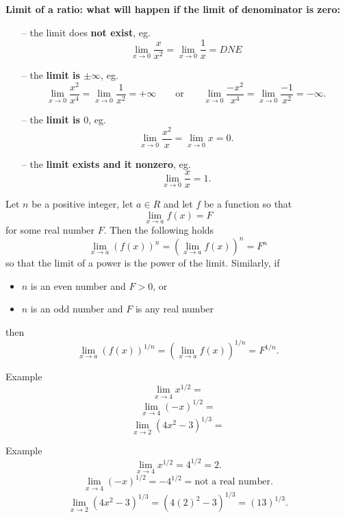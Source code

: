 \documentclass{beamer}
\begin{document}
\begin{frame}{{\bf Limit of a ratio: what will happen if the limit of denominator is zero:}}
\begin{itemize}
	\item[--] the limit does {\bf not exist}, eg. 
	$$  \lim_{x\to 0} \frac{x}{x^2}=\lim_{x\to 0} \frac{1}{x}=DNE$$ \pause
	\item[--] the {\bf limit is $\pm \infty$}, eg. 
	$$\lim_{x\to 0} \frac{x^2}{x^4}=\lim_{x\to 0} \frac{1}{x^2}=+\infty \quad \quad \text{or} \quad \quad \lim_{x\to 0} \frac{-x^2}{x^4}=\lim_{x\to 0} \frac{-1}{x^2}=-\infty.$$\pause 
	\item[--] the {\bf limit is $0$}, eg. $$\lim_{x\to 0} \frac{x^2}{x}=\lim_{x\to 0} x=0.$$ \pause 
	\item[--] the {\bf limit exists and it nonzero}, eg. $$\lim_{x\to 0} \frac{x}{x}=1.$$
\end{itemize}
\end{frame}

\begin{frame}

\begin{tcolorbox}[width=\textwidth,colback={blue!10},title={},colbacktitle=yellow,coltitle=blue]  
	\begin{theorem}
		Let $n$ be a positive integer, let $a\in R$ and let $f$ be a function so that
		$$\lim_{x\to a}f(x)=F$$ for some real number $F$. Then the following holds
		$$ \lim_{x\to a}(f(x))^n=\left( \lim_{x\to a} f(x) \right)^n=F^n$$ so that the limit of a power is the power of the limit. \pause Similarly, if 
		\begin{itemize}
			\item $n$ is an even number and $F>0$, or 
			\item $n$ is an odd number and $F$ is any real number 
		\end{itemize}
		then 
		$$ \lim_{x\to a}(f(x))^{1/n}=\left( \lim_{x\to a}f(x) \right)^{1/n}=F^{1/n}.$$
	\end{theorem}
\end{tcolorbox}

\end{frame}

\begin{frame}{Example}
	$$\lim_{x\to 4}x^{1/2}=$$
	$$\lim_{x\to 4}(-x)^{1/2}=$$
	$$ \lim_{x\to 2} (4x^2-3)^{1/3}=$$
\end{frame}

\begin{frame}{Example}
$$\lim_{x\to 4}x^{1/2}=4^{1/2}=2.$$
$$\lim_{x\to 4}(-x)^{1/2}=-4^{1/2}=\text{not a real number}.$$
$$ \lim_{x\to 2} (4x^2-3)^{1/3}=(4(2)^2-3)^{1/3}=(13)^{1/3}.$$
\end{frame}
\end{document}
